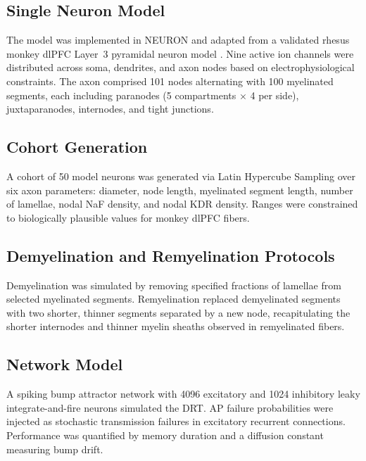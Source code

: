 \documentclass[11pt]{article}
\begin{document}
\subsection{Single Neuron Model}

The model was implemented in NEURON \citep{hines1997neuron} and adapted from a validated rhesus monkey dlPFC Layer~3 pyramidal neuron model \citep{rumbell2016dimensionality}. Nine active ion channels were distributed across soma, dendrites, and axon nodes based on electrophysiological constraints. The axon comprised 101 nodes alternating with 100 myelinated segments, each including paranodes (5 compartments $\times$ 4 per side), juxtaparanodes, internodes, and tight junctions.

\subsection{Cohort Generation}

A cohort of 50 model neurons was generated via Latin Hypercube Sampling \citep{mckay1979comparison} over six axon parameters: diameter, node length, myelinated segment length, number of lamellae, nodal NaF density, and nodal KDR density. Ranges were constrained to biologically plausible values for monkey dlPFC fibers.

\subsection{Demyelination and Remyelination Protocols}

Demyelination was simulated by removing specified fractions of lamellae from selected myelinated segments. Remyelination replaced demyelinated segments with two shorter, thinner segments separated by a new node, recapitulating the shorter internodes and thinner myelin sheaths observed in remyelinated fibers.

\subsection{Network Model}

A spiking bump attractor network \citep{compte2000synaptic, wang2001probabilistic} with 4096 excitatory and 1024 inhibitory leaky integrate-and-fire neurons simulated the DRT. AP failure probabilities were injected as stochastic transmission failures in excitatory recurrent connections. Performance was quantified by memory duration and a diffusion constant measuring bump drift.
\end{document}
